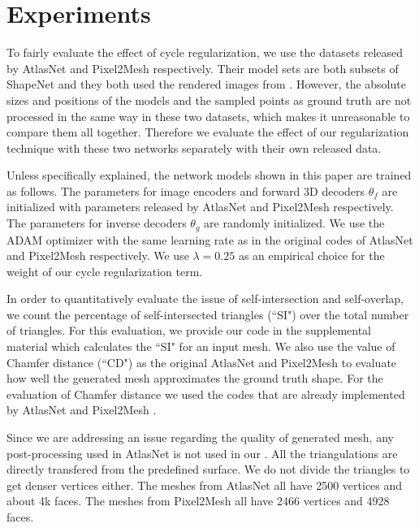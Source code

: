\section{Experiments}
 To fairly evaluate the effect of cycle regularization, we use the datasets released by AtlasNet and Pixel2Mesh respectively. Their model sets are both subsets of ShapeNet \cite{shapenetdata} and they both used the rendered images from \cite{3DR2N2} . However, the absolute sizes and positions of the models and the sampled points as ground truth are not processed in the same way in these two datasets, which makes it unreasonable to compare them all together. Therefore we evaluate the effect of our regularization technique with these two networks separately with their own released data.

Unless specifically explained, the network models shown in this paper are trained as follows. The parameters for image encoders and forward 3D decoders $\theta_f$ are initialized with parameters released by AtlasNet \cite{atlasnet} and Pixel2Mesh \cite{pixel2mesh} respectively. The parameters for inverse decoders $\theta_g$ are randomly initialized. We use the ADAM \cite{adam} optimizer with the same learning rate as in the original codes of AtlasNet and Pixel2Mesh respectively. We use $\lambda=0.25$ as an empirical choice for the weight of our cycle regularization term.

In order to quantitatively evaluate the issue of self-intersection and self-overlap, we count the percentage of self-intersected triangles (``SI") over the total number of triangles. For this evaluation, we provide our code in the supplemental material which calculates the ``SI" for an input mesh.  
We also use the value of Chamfer distance (``CD") as the original AtlasNet and Pixel2Mesh to evaluate how well the generated mesh approximates the ground truth shape. For the evaluation of Chamfer distance we used the codes that are already implemented by AtlasNet \cite{atlasnet} and Pixel2Mesh \cite{pixel2mesh}.

 Since we are addressing an issue regarding the quality of generated mesh, any post-processing used in AtlasNet \cite{atlasnet} is not used in our . All the triangulations are directly transfered from the predefined surface. We do not divide the triangles to get denser vertices either. The meshes from AtlasNet all have 2500 vertices and about 4k faces. The meshes from Pixel2Mesh all have 2466 vertices and 4928 faces.

